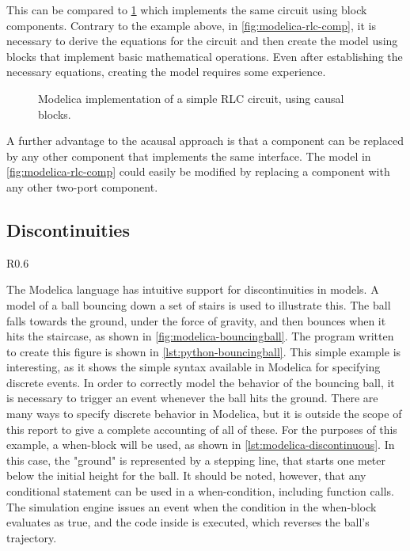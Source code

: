 \documentclass[\rootfolder/main.tex]{subfiles}
\begin{document}
This can be compared to \cref{fig:modelica-rlc-block} which implements the same circuit using block components.
Contrary to the example above, in \cref{fig:modelica-rlc-comp}, it is necessary to derive the equations for the circuit and then create the model using blocks that implement basic mathematical operations.
Even after establishing the necessary equations, creating the model requires some experience.

\begin{figure}[ht]
    \caption{Modelica implementation of a simple RLC circuit, using causal blocks.\label{fig:modelica-rlc-block}}
\end{figure}

A further advantage to the acausal approach is that a component can be replaced by any other component that implements the same interface.
The model in \cref{fig:modelica-rlc-comp} could easily be modified by replacing a component with any other two-port component.

\subsection{Discontinuities}

\begin{wrapfigure}{R}{0.6\columnwidth}
    \caption{Simulation output of the bouncing ball model shown in \cref{lst:modelica-discontinuous}.\label{fig:modelica-bouncingball}}
\end{wrapfigure}

The Modelica language has intuitive support for discontinuities in models.
A model of a ball bouncing down a set of stairs is used to illustrate this.
The ball falls towards the ground, under the force of gravity, and then bounces when it hits the staircase, as shown in \cref{fig:modelica-bouncingball}.
The program written to create this figure is shown in \cref{lst:python-bouncingball}.
This simple example is interesting, as it shows the simple syntax available in Modelica for specifying discrete events.
In order to correctly model the behavior of the bouncing ball, it is necessary to trigger an event whenever the ball hits the ground.
There are many ways to specify discrete behavior in Modelica, but it is outside the scope of this report to give a complete accounting of all of these.
For the purposes of this example, a when-block will be used, as shown in \cref{lst:modelica-discontinuous}.
In this case, the "ground" is represented by a stepping line, that starts one meter below the initial height for the ball.
It should be noted, however, that any conditional statement can be used in a when-condition, including function calls.
The simulation engine issues an event when the condition in the when-block evaluates as true, and the code inside is executed, which reverses the ball's trajectory.
\end{document}

